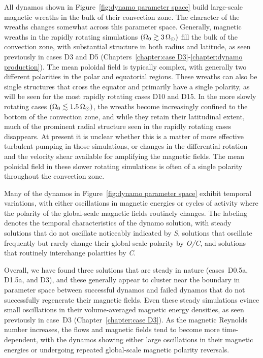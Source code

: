 All dynamos shown in Figure~\ref{fig:dynamo parameter space} build
large-scale magnetic wreaths in the bulk of their convection zone.
The character of the wreaths changes somewhat
across this parameter space.  Generally, magnetic wreaths in the
rapidly rotating simulations $(\Omega_0 \gtrsim 3\thinspace \Omega_\odot)$ fill the
bulk of the convection zone, with substantial structure in both radius
and latitude, as seen previously in cases D3 and D5
(Chapters~\ref{chapter:case D3}-\ref{chapter:dynamo production}). 
The mean poloidal field is typically complex, with generally two
different polarities in the polar and equatorial regions.  These wreaths
can also be single structures that cross the equator and primarily
have a single polarity, as will be seen for the most rapidly rotating
cases D10 and D15.  In the more slowly rotating cases $(\Omega_0 \lesssim
1.5 \thinspace\Omega_\odot)$, the wreaths become increasingly confined to the
bottom of the convection zone, and while they retain their latitudinal
extent, much of the prominent radial structure seen in the rapidly
rotating cases disappears.  At present it is unclear whether this is a
matter of more effective turbulent pumping in those simulations, or
changes in the differential rotation and the velocity shear available
for amplifying the magnetic fields.  The mean poloidal field in
these slower rotating simulations is often of a single polarity
throughout the convection zone.

Many of the dynamos in Figure~\ref{fig:dynamo parameter space}
exhibit temporal variations, with either
oscillations in magnetic energies or cycles of activity where the
polarity of the global-scale magnetic fields routinely changes.  The
labeling denotes the temporal characteristics of the dynamo
solution, with steady solutions that do not oscillate noticeably
indicated by \emph{S}, solutions that oscillate frequently but rarely change
their global-scale polarity by \emph{O/C}, and solutions that routinely
interchange polarities by \emph{C}.  

Overall, we have found three solutions that are steady in nature
(cases~D0.5a, D1.5a, and D3), and these generally appear to cluster
near the boundary in parameter space between successful dynamos and
failed dynamos that do not successfully regenerate their magnetic
fields.  Even these steady simulations evince small oscillations in
their volume-averaged magnetic energy densities, as seen previously in
case~D3 (Chapter~\ref{chapter:case D3}).  As the magnetic Reynolds
number increases, the flows and magnetic fields tend to become more
time-dependent, with the dynamos showing either large oscillations in
their magnetic energies or undergoing repeated global-scale magnetic
polarity reversals. 

